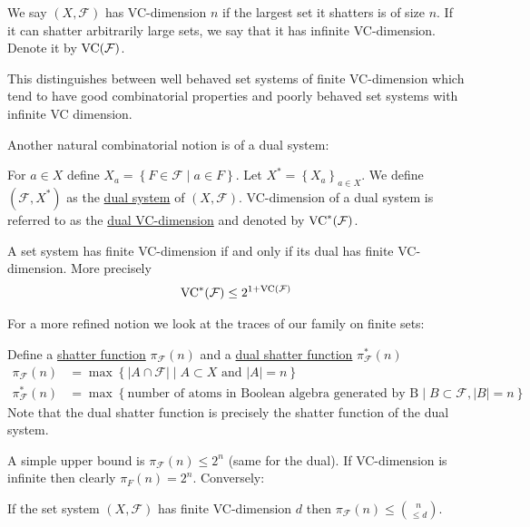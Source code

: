 \documentclass{amsart}
\newcommand{\F}{\mathcal F}
\newcommand{\curly}[1]{\left\{#1\right\}}
\newcommand{\defn}{\underline}
\begin{document}
\begin{Definition}
  We say $(X, \F)$ has VC-dimension $n$ if the largest set it shatters is of size $n$.
  If it can shatter arbitrarily large sets, we say that it has infinite VC-dimension.
  Denote it by $\VC(\F)$.
\end{Definition}  

This distinguishes between well behaved set systems of finite VC-dimension which tend to have good combinatorial properties and
poorly behaved set systems with infinite VC dimension.

Another natural combinatorial notion is of a dual system:
\begin{Definition}
  For $a \in X$ define $X_a = \curly{F \in \F \mid a \in F}$.
  Let $X^* = \curly{X_a}_{a \in X}$.
  We define $(\F, X^*)$ as the \defn{dual system} of $(X, \F)$.
  VC-dimension of a dual system is referred to as the \defn{dual VC-dimension} and denoted by $\VC^*(\F)$.
\end{Definition}  

\begin{Lemma}
  A set system has finite VC-dimension if and only if its dual has finite VC-dimension.
  More precisely
  \begin{align*}
    \VC^*(\F) \leq 2^{1+\VC(\F)}
  \end{align*}
\end{Lemma}

For a more refined notion we look at the traces of our family on finite sets:
\begin{Definition}
  Define a \defn{shatter function} $\pi_\F(n)$ and a \defn{dual shatter function} $\pi^*_\F(n)$
  \begin{align*}
    \pi_\F(n) &= \max \curly{|A \cap \F| \mid A \subset X \text{ and } |A| = n} \\
    \pi^*_\F(n) &= \max \curly{\text{number of atoms in Boolean algebra generated by B} \mid B \subset \F, |B| = n}
  \end{align*}
  Note that the dual shatter function is precisely the shatter function of the dual system.
\end{Definition}  

A simple upper bound is $\pi_\F(n) \leq 2^n$ (same for the dual).
If VC-dimension is infinite then clearly $\pi_F(n) = 2^n$. Conversely:
\begin{Theorem} 
  If the set system $(X, \F)$ has finite VC-dimension $d$ then $\pi_\F(n) \leq {n \choose \leq d}$.    
\end{Theorem}
\end{document}
